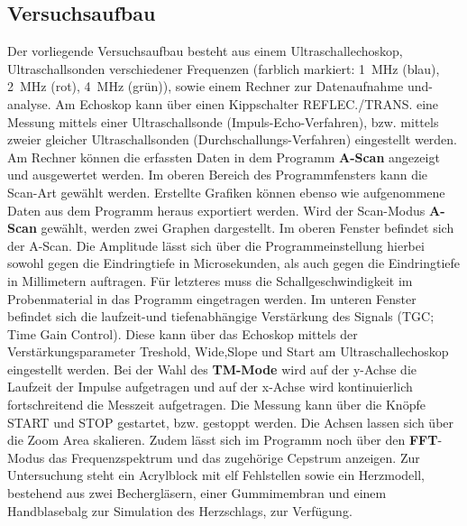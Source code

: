 \subsection{Versuchsaufbau}
\label{sec:Versuchsaufbau}
Der vorliegende Versuchsaufbau besteht aus einem Ultraschallechoskop, Ultraschallsonden verschiedener Frequenzen (farblich markiert: \SI{1}{\mega\Hz} (blau),  \SI{2}{\mega\Hz} (rot),  \SI{4}{\mega\Hz} (grün)), sowie einem Rechner zur Datenaufnahme und-analyse.
Am Echoskop kann über einen Kippschalter REFLEC./TRANS. eine Messung mittels einer Ultraschallsonde (Impuls-Echo-Verfahren), bzw. mittels zweier gleicher Ultraschallsonden (Durchschallungs-Verfahren) eingestellt werden.
Am Rechner können die erfassten Daten in dem Programm \textbf{A-Scan} angezeigt und ausgewertet werden.
Im oberen Bereich des Programmfensters kann die Scan-Art gewählt werden.
Erstellte Grafiken können ebenso wie aufgenommene Daten aus dem Programm heraus exportiert werden.
Wird der Scan-Modus \textbf{A-Scan} gewählt, werden zwei Graphen dargestellt. Im oberen Fenster befindet sich der A-Scan. Die Amplitude lässt sich über die Programmeinstellung hierbei sowohl gegen die Eindringtiefe in Microsekunden, als auch gegen die Eindringtiefe in Millimetern auftragen. Für letzteres muss die Schallgeschwindigkeit im Probenmaterial in das Programm eingetragen werden.
Im unteren Fenster befindet sich die laufzeit-und tiefenabhängige Verstärkung des Signals (TGC; Time Gain Control). Diese kann über das Echoskop mittels der Verstärkungsparameter Treshold, Wide,Slope und Start am Ultraschallechoskop eingestellt werden.
Bei der Wahl des \textbf{TM-Mode} wird auf der y-Achse die Laufzeit der Impulse aufgetragen und auf der x-Achse wird kontinuierlich fortschreitend die Messzeit aufgetragen.
Die Messung kann über die Knöpfe START und STOP gestartet, bzw. gestoppt werden.
Die Achsen lassen sich über die Zoom Area skalieren.
Zudem lässt sich im Programm noch über den \textbf{FFT}-Modus das Frequenzspektrum und das zugehörige Cepstrum anzeigen.
Zur Untersuchung steht ein Acrylblock mit elf Fehlstellen sowie ein Herzmodell, bestehend aus zwei Bechergläsern, einer Gummimembran und einem Handblasebalg zur Simulation des Herzschlags, zur Verfügung.
